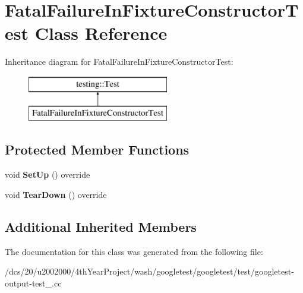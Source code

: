 \hypertarget{classFatalFailureInFixtureConstructorTest}{}\section{Fatal\+Failure\+In\+Fixture\+Constructor\+Test Class Reference}
\label{classFatalFailureInFixtureConstructorTest}
Inheritance diagram for Fatal\+Failure\+In\+Fixture\+Constructor\+Test\+:\begin{figure}[H]
\begin{center}
\leavevmode
\includegraphics[height=2.000000cm]{classFatalFailureInFixtureConstructorTest}
\end{center}
\end{figure}
\subsection*{Protected Member Functions}
\begin{DoxyCompactItemize}
\item 
\mbox{\label{classFatalFailureInFixtureConstructorTest_af61931410069b47222d50b8ef90624f2}} 
void {\bfseries Set\+Up} () override
\item 
\mbox{\label{classFatalFailureInFixtureConstructorTest_a533465f7e241d56cb21ec11aa94f1908}} 
void {\bfseries Tear\+Down} () override
\end{DoxyCompactItemize}
\subsection*{Additional Inherited Members}


The documentation for this class was generated from the following file\+:\begin{DoxyCompactItemize}
\item 
/dcs/20/u2002000/4th\+Year\+Project/wash/googletest/googletest/test/googletest-\/output-\/test\+\_\+.\+cc\end{DoxyCompactItemize}
